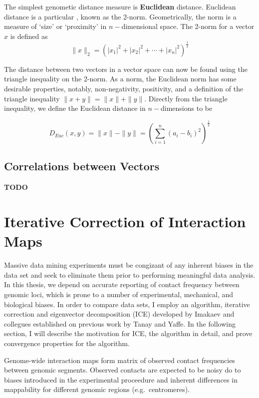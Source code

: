 \documentclass[phd,tocprelim]{cornell}
\begin{document}
The simplest genometic distance measure is \textbf{Euclidean} distance.  Euclidean distance is a particular , known as
the 2-norm.  Geometrically, the norm is a measure of `size' or `proximity' in $n-$dimensional space.  The 2-norm for a vector $x$ is
defined as
\[
  \|x\|_{2} = {(|x_1|^2 + |x_2|^2 + \cdots + |x_n|^2)}^{\frac{1}{2}}
\]

The distance between two vectors in a vector space can now be found using the triangle inequality on the 2-norm.  As a norm, the Euclidean
norm has some desirable properties, notably, non-negativity, positivity, and a definition of the triangle inequality
$\|x + y\| = \|x\| + \|y\|$\cite{horn2013}.  Directly from the triangle inequality, we define the Euclidean distance
in $n-$dimensions to be

\[
  D_{Euc}(x,y) = \|x\| - \|y\| = {(\sum_{i=1}^{n}{(a_i - b_i)}^2)}^{\frac{1}{2}}
\]

\subsection{Correlations between Vectors}

\textbf{TODO}

\section{Iterative Correction of Interaction Maps}

Massive data mining experiments must be congizant of any inherent biases in the data set and seek to eliminate them prior to performing
meaningful data analysis.  In this thesis, we depend on accurate reporting of contact frequency between genomic loci, which is prone
to a number of experimental, mechanical, and biological biases\cite{dekker2006}.  In order to compare data sets, I employ an algorithm,
iterative correction and eigenvector decomposition (ICE) developed by Imakaev and collegues\cite{imakaev2012} established on previous
work by Tanay and Yaffe\cite{yaffe2011}.  In the following section, I will describe the motivation for ICE, the algorithm in detail, and
prove convergence properties for the algorithm.

Genome-wide interaction maps form matrix of observed contact frequencies between genomic segments.  Observed contacts are expected to
be noisy do to biases introduced in the experimental proceedure and inherent differences in mappability for different genomic regions 
(e.g.\ centromeres).
\end{document}
